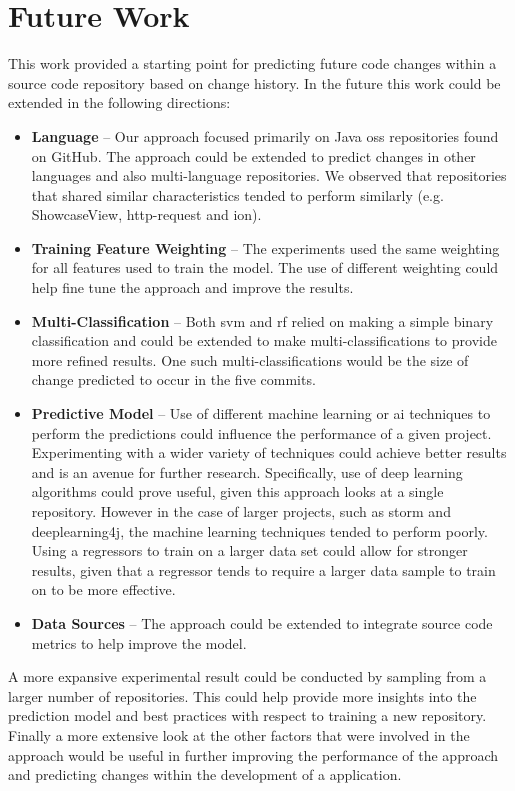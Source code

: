 \section{Future Work}

This work provided a starting point for predicting future code changes within a source code repository based on change history. In the future this work could be extended in the following directions:

\begin{itemize}
\item \textbf{Language} -- Our approach focused primarily on Java \gls{oss} repositories found on GitHub. The approach could be extended to predict changes in other languages and also multi-language repositories. We observed that repositories that shared similar characteristics tended to perform similarly (e.g. ShowcaseView, http-request and ion).
\item \textbf{Training Feature Weighting} -- The experiments used the same weighting for all features used to train the model. The use of different weighting could help fine tune the approach and improve the results.
\item \textbf{Multi-Classification} -- Both \gls{svm} and \gls{rf} relied on making a simple binary classification and could be extended to make multi-classifications to provide more refined results. One such multi-classifications would be the size of change predicted to occur in the five commits.
\item \textbf{Predictive Model} -- Use of different machine learning or \gls{ai} techniques to perform the predictions could influence the performance of a given project. Experimenting with a wider variety of techniques could achieve better results and is an avenue for further research. Specifically, use of deep learning algorithms could prove useful, given this approach looks at a single repository. However in the case of larger projects, such as storm and deeplearning4j, the machine learning techniques tended to perform poorly. Using a regressors to train on a larger data set could allow for stronger results, given that a regressor tends to require a larger data sample to train on to be more effective.
\item \textbf{Data Sources} -- The approach could be extended to integrate source code metrics to help improve the model. 
\end{itemize}

A more expansive experimental result could be conducted by sampling from a larger number of repositories. This could help provide more insights into the prediction model and best practices with respect to training a new repository. Finally a more extensive look at the other factors that were involved in the approach would be useful in further improving the performance of the approach and predicting changes within the development of a application.






